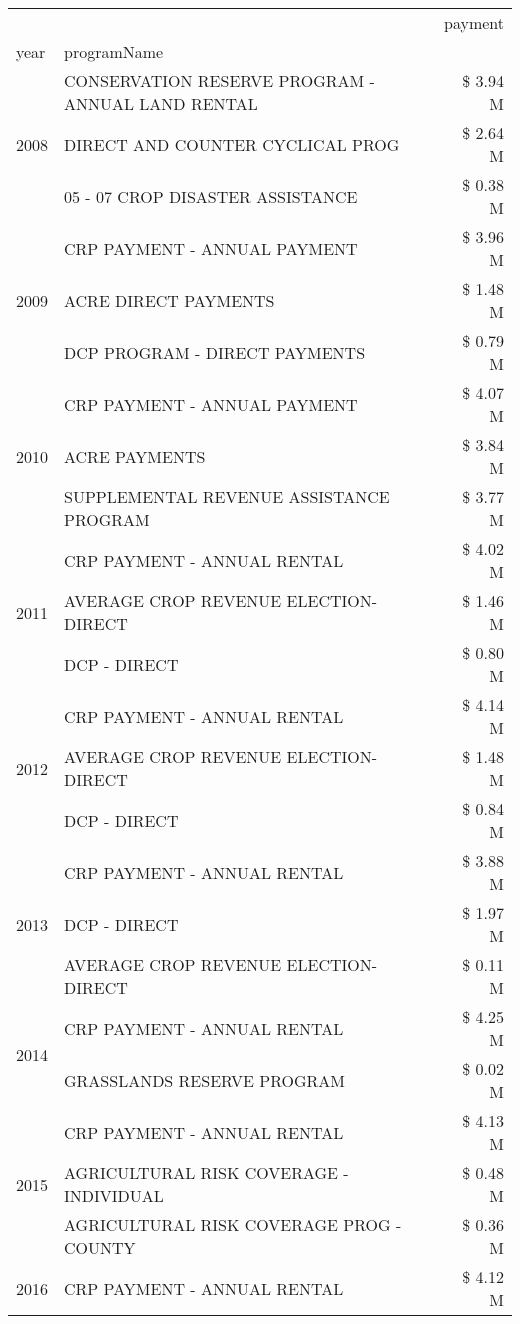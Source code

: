 \begin{tabular}{llr}
\toprule
 &  & payment \\
year & programName &  \\
\midrule
\multirow[t]{3}{*}{2008} & CONSERVATION RESERVE PROGRAM - ANNUAL LAND RENTAL & \$ 3.94 M \\
 & DIRECT AND COUNTER CYCLICAL PROG & \$ 2.64 M \\
 & 05 - 07 CROP DISASTER ASSISTANCE & \$ 0.38 M \\
\cline{1-3}
\multirow[t]{3}{*}{2009} & CRP PAYMENT - ANNUAL PAYMENT & \$ 3.96 M \\
 & ACRE DIRECT PAYMENTS & \$ 1.48 M \\
 & DCP PROGRAM - DIRECT PAYMENTS & \$ 0.79 M \\
\cline{1-3}
\multirow[t]{3}{*}{2010} & CRP PAYMENT - ANNUAL PAYMENT & \$ 4.07 M \\
 & ACRE PAYMENTS & \$ 3.84 M \\
 & SUPPLEMENTAL REVENUE ASSISTANCE PROGRAM & \$ 3.77 M \\
\cline{1-3}
\multirow[t]{3}{*}{2011} & CRP PAYMENT - ANNUAL RENTAL & \$ 4.02 M \\
 & AVERAGE CROP REVENUE ELECTION-DIRECT & \$ 1.46 M \\
 & DCP - DIRECT & \$ 0.80 M \\
\cline{1-3}
\multirow[t]{3}{*}{2012} & CRP PAYMENT - ANNUAL RENTAL & \$ 4.14 M \\
 & AVERAGE CROP REVENUE ELECTION-DIRECT & \$ 1.48 M \\
 & DCP - DIRECT & \$ 0.84 M \\
\cline{1-3}
\multirow[t]{3}{*}{2013} & CRP PAYMENT - ANNUAL RENTAL & \$ 3.88 M \\
 & DCP - DIRECT & \$ 1.97 M \\
 & AVERAGE CROP REVENUE ELECTION-DIRECT & \$ 0.11 M \\
\cline{1-3}
\multirow[t]{2}{*}{2014} & CRP PAYMENT - ANNUAL RENTAL & \$ 4.25 M \\
 & GRASSLANDS RESERVE PROGRAM & \$ 0.02 M \\
\cline{1-3}
\multirow[t]{3}{*}{2015} & CRP PAYMENT - ANNUAL RENTAL & \$ 4.13 M \\
 & AGRICULTURAL RISK COVERAGE - INDIVIDUAL & \$ 0.48 M \\
 & AGRICULTURAL RISK COVERAGE PROG - COUNTY & \$ 0.36 M \\
\cline{1-3}
\multirow[t]{3}{*}{2016} & CRP PAYMENT - ANNUAL RENTAL & \$ 4.12 M \\

\end{tabular}
